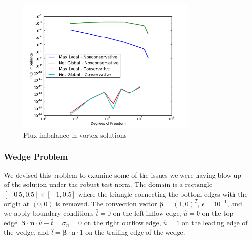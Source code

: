 \documentclass[letterpaper]{article}
\def\bbeta{\boldsymbol\beta}
\begin{document}
\begin{figure}[p]
\centering
\includegraphics[width=0.8\textwidth]{figs/Vortex/modifiedFlux.pdf}
\caption{Flux imbalance in vortex solutions}
\label{fig:vortex_flux}
\end{figure}

\subsubsection{Wedge Problem}
We devised this problem to examine some of the issues we were having blow up
of the solution under the robust test norm. The domain is a rectangle
$[-0.5,0.5]\times[-1,0.5]$ where the triangle connecting the bottom edges with
the origin at $(0,0)$ is removed. The convection vector $\bbeta=(1,0)^T$,
$\epsilon=10^{-1}$, and we apply boundary conditions $\hat t=0$ on the left
inflow edge, $\hat u=0$ on the top edge, $\bbeta\cdot\mathbf{n}\cdot\hat
u-\hat t=\sigma_n=0$ on the right outflow edge, $\hat u=1$ on the leading edge
of the wedge, and $\hat t=\bbeta\cdot\mathbf{n}\cdot 1$ on the trailing edge
of the wedge.
\end{document}
